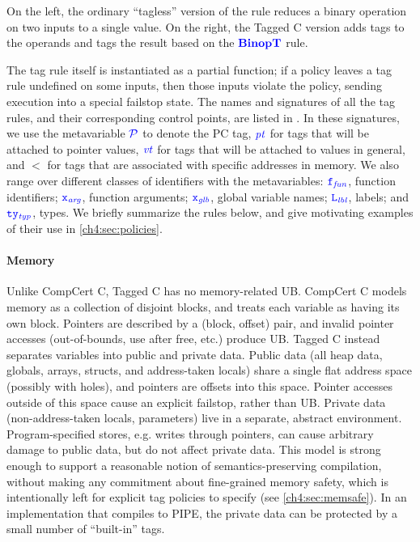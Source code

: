 \begin{minipage}[t]{0.24\textwidth}
  \binopsteptagless
\end{minipage}
\begin{minipage}[t]{0.75\textwidth}
  \binopstepnolabel
\end{minipage}

\noindent
On the left, the ordinary ``tagless'' version of the rule reduces a
binary operation on two inputs to a single value.
On the right, the Tagged C version adds tags to the operands and tags the result
based on the \(\color{blue} \mathbf{BinopT}\) rule.

The tag rule itself is instantiated as a partial function; if a policy leaves a tag rule
undefined on some inputs, then those inputs violate the policy, sending
execution into a special failstop state. The names and signatures of all the tag rules,
and their corresponding control points, are listed in .
In these signatures, we use the metavariable \(\mathcal{\color{blue} P\mathit{}}\) to denote the PC tag,
\(\mathit{\color{blue} pt}\) for tags that will be attached to pointer values, \(\mathit{\color{blue} vt}\) for tags that will be
attached to values in general, and \(\lt\) for tags that are associated with
specific addresses in memory. We also range over different classes of identifiers
with the metavariables: \(\mathtt{\color{blue} f}_{\color{blue} \mathit{fun}}\), function identifiers; \(\mathtt{\color{blue} x}_{\color{blue} \mathit{arg}}\), function arguments;
\(\mathtt{\color{blue} x}_{\color{blue} \mathit{glb}}\), global variable names; \(\mathtt{\color{blue} L}_{\color{blue} \mathit{lbl}}\), labels; and \(\mathtt{\color{blue} ty}_{\color{blue} \mathit{typ}}\), types.
We briefly summarize the rules below, and give motivating examples of their use in
\cref{ch4:sec:policies}.

\paragraph{Memory} Unlike CompCert C, Tagged C has no memory-related UB.
CompCert C models memory as a collection of disjoint blocks,
and treats each variable as having its own block. Pointers are described by a (block, offset) pair,
and invalid pointer accesses (out-of-bounds, use after free, etc.) produce UB.
Tagged C instead separates variables
into public and private data. Public data (all heap data, globals, arrays, structs, and
address-taken locals) share a single flat address space (possibly with holes), and pointers are
offsets into this space. Pointer accesses outside of this space cause
an explicit failstop, rather than UB. 
Private data (non-address-taken locals, parameters) live in a separate, abstract environment.
Program-specified stores, e.g. writes through pointers, can cause arbitrary damage to public
data, but do not affect private data. 
This model is strong enough to support a reasonable
notion of semantics-preserving compilation, without making any commitment about fine-grained
memory safety, which is intentionally left for explicit tag policies to specify
(see \cref{ch4:sec:memsafe}).
In an implementation that compiles to PIPE, the private data can be protected by a small number of
``built-in'' tags.

